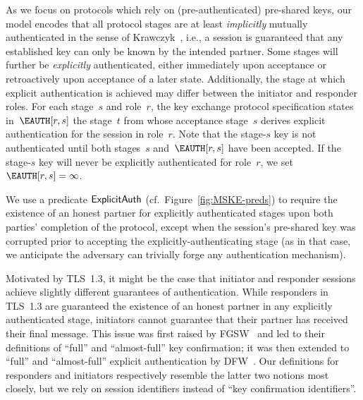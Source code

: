 As we focus on protocols which rely on (pre-authenticated) pre-shared keys,
our model encodes that all protocol stages are at least \emph{implicitly} mutually authenticated in the sense of Krawczyk~\cite{EPRINT:Krawczyk05},
i.e., a session is guaranteed that any established key can only be known by the intended partner.
Some stages will further be \emph{explicitly} authenticated, either immediately upon acceptance or retroactively upon acceptance of a later state. 
Additionally, the stage at which explicit authentication is achieved may differ between the initiator and responder roles.
For each stage~$s$ and role~$r$, the key exchange protocol specification states in~$\EAUTH[r, s]$ the stage~$t$ from whose acceptance stage~$s$ derives explicit authentication for the session in role~$r$.
Note that the stage-$s$ key is not authenticated until both stages~$s$ and~$\EAUTH[r, s]$ have been accepted. 
If the stage-$s$ key will never be explicitly authenticated for role~$r$, we set $\EAUTH[r,s] = \infty$.

We use a predicate $\mathsf{ExplicitAuth}$ 
	(cf.\ Figure~\ref{fig:MSKE-preds})
to require the existence of an honest partner for explicitly authenticated stages upon both parties' completion of the protocol, except when the session's pre-shared key was corrupted prior to accepting the explicitly-authenticating stage
(as in that case, we anticipate the adversary can trivially forge any authentication mechanism).

Motivated by TLS~1.3, it might be the case that initiator and responder sessions achieve slightly different guarantees of authentication.
While responders in TLS~1.3 are guaranteed the existence of an honest partner in any explicitly authenticated stage, initiators cannot guarantee that their partner has received their final message.
This issue was first raised by FGSW~\cite{SP:FGSW16} and led to their definitions of ``full'' and ``almost-full'' key confirmation; it was then extended to ``full'' and ``almost-full'' explicit authentication by DFW~\cite{CSF:deSFisWar20}. 
Our definitions for responders and initiators respectively resemble the latter two notions most closely, but we rely on session identifiers instead of ``key confirmation identifiers''.

